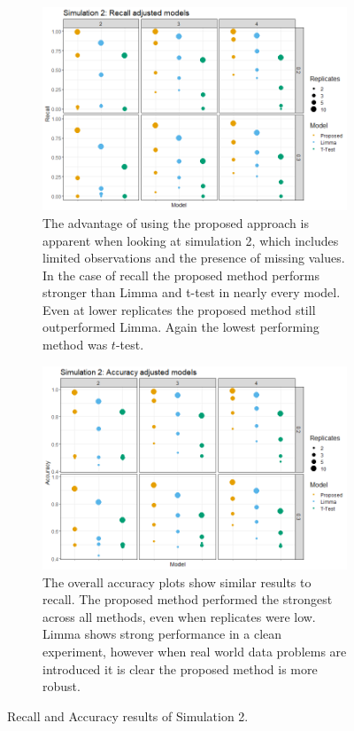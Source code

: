 \documentclass{mcp}
\begin{document}
\begin{figure}[h!]
\centering
 \begin{subfigure}{\textwidth}
  \centering
	\includegraphics[width=.8\textwidth]{sim_new/sim3_Recall}
	\caption{The advantage of using the proposed approach is apparent when looking at simulation 2, which includes limited observations and the presence of missing values. In the case of recall the proposed method performs stronger than Limma and t-test in nearly every model. Even at lower replicates the proposed method still outperformed Limma. Again the lowest performing method was $t$-test.}
 \end{subfigure}
 \begin{subfigure}{\textwidth}
  \centering
	\includegraphics[width=.8\textwidth]{sim_new/sim3_Accuracy}
	\caption{The overall accuracy plots show similar results to recall. The proposed method performed the strongest across all methods, even when replicates were low. Limma shows strong performance in a clean experiment, however when real world data problems are introduced it is clear the proposed method is more robust.}
 \end{subfigure}
\caption{Recall and Accuracy results of Simulation 2.}
\label{fig:sim2_recall}
\end{figure}
\end{document}
